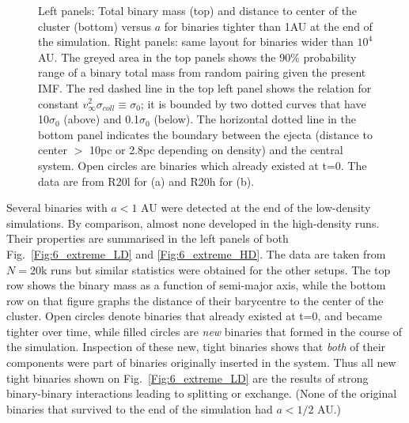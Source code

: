 \begin{figure}
\begin{center}
\begin{subfigure}[b]{0.9\textwidth}
    \end{subfigure}
\caption[Extreme tight and wide binaries]{Left panels: Total binary mass (top) and distance to center of the cluster (bottom) versus $a$ for binaries tighter than 1AU at the end of the simulation. Right panels: same layout for binaries wider than $10^4$AU. The greyed area in the top panels shows the 90\% probability range of a binary total mass from random pairing given the present IMF. The  red dashed line in the top left panel shows the relation for  constant $v^2_\infty \sigma_{coll} \equiv \sigma_0$; it is bounded by two dotted curves that have 10$\sigma_0$ (above) and 0.1$\sigma_0$ (below). The horizontal dotted line in the bottom panel indicates the boundary between the ejecta (distance to center $>$ 10pc or 2.8pc depending on density) and the central system. Open circles are binaries which already existed at t=0. The data are from R20l for (a) and R20h for (b).}
\label{Fig:6_extreme}
\end{center}
\end{figure}


Several binaries with $a < 1 $ AU were detected at the end of the low-density simulations. By comparison, almost none developed in the high-density runs. Their properties are summarised in the left panels of both Fig.~\ref{Fig:6_extreme_LD} and \ref{Fig:6_extreme_HD}. 
The data are taken from $N = 20$k runs but similar statistics were obtained for the other setups. 
The top row shows the binary mass as a function of semi-major axis, while the  bottom row on that figure  graphs the distance of their barycentre to the center of the cluster. Open circles denote binaries that already existed at t=0, and became tighter over time, while filled circles are {\it new} binaries that formed in the course of the simulation. Inspection of these new, tight  binaries shows that {\it both} of their components were part of  binaries originally inserted in the system. Thus all new tight binaries shown on Fig.~\ref{Fig:6_extreme_LD}  are the results of strong binary-binary interactions leading to splitting or exchange. (None of the original  binaries that survived 	to the end of the simulation had  $a < 1/2 $ AU.)
	
 
